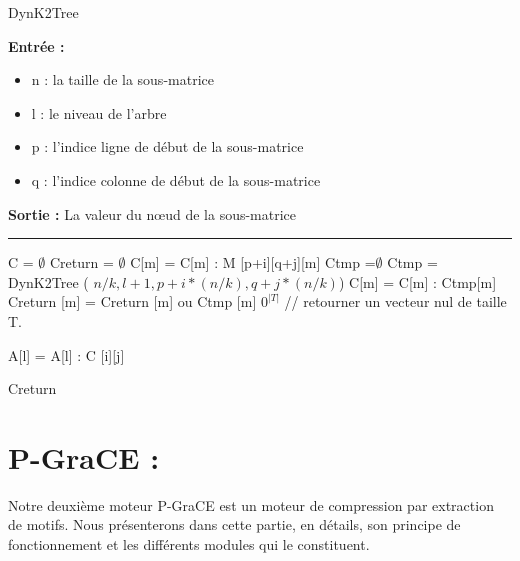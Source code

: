 \documentclass[a4paper,oneside,12pt]{report}
\theoremstyle{definition}
\begin{document}
	
					\begin{algorithm}[H]
					\label{alg:dynk2_tree}
					\caption{DynK2Tree}
					\textbf{Entrée :}
						\begin{itemize}[label=$\bullet$]
							\item n : la taille de la sous-matrice
							\item l : le niveau de l'arbre
							\item p : l'indice ligne de début de la sous-matrice
							\item q : l'indice colonne de début de la sous-matrice
						\end{itemize}
					\textbf{Sortie :} La valeur du nœud de la sous-matrice\\							\noindent\rule{\textwidth}{1pt}
						
						
				\begin{algorithmic} [1]
					\STATE C = $ \emptyset$
					\STATE Creturn  = $ \emptyset$
									\STATE C[m] = C[m] : M [p+i][q+j][m]
								\ENDFOR
							\ELSE
								\STATE Ctmp =$\emptyset$
								\STATE  Ctmp = DynK2Tree ( $n/k,l+1,p+i*(n/k), q+j*(n/k)$)
									\STATE C[m] = C[m] : Ctmp[m]
									\STATE Creturn [m] = Creturn [m] ou Ctmp [m]
								\ENDFOR
							\ENDIF
						\ENDFOR
					\ENDFOR
						\RETURN $0^{|T|}$ // retourner un vecteur nul de taille T.
					\ENDIF
					
					
					
								\STATE A[l] = A[l] : C [i][j]
							\ENDIF
						\ENDFOR
					\ENDFOR
	
					 \RETURN Creturn
					
				\end{algorithmic}
			\end{algorithm}
			
			
	
	
	
	\section{P-GraCE :}
	
	Notre deuxième moteur \gls{P-GraCE} est un moteur de compression par extraction de motifs. Nous présenterons dans cette partie, en détails, son principe de fonctionnement et les différents modules qui le constituent.
	
\end{document}
